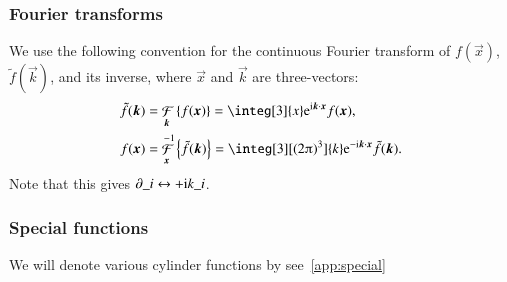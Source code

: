 \subsubsection{Fourier transforms} %
We use the following convention for the continuous Fourier transform of $f(\vec{x})$, $\tilde{f}(\vec{k})$, and its inverse, where $\vec{x}$ and $\vec{k}$ are three-vectors:
\begin{equation}\label{eq:notation:Fourier_transform_and_inverse}
    \begin{split}
        \tilde{f}(\vec{k}) &=\mathop{\mathcal{F}}_{\vec{k}} {\cclosed{f(\vec{x})}}  =\integ[3]{x}\eu[\im \vec{k}\cdot \vec{x}]f(\vec{x}), \\
        f(\vec{x}) &=  \mathop{\mathcal{F}}_{\vec{x}}^{-1}  {\cclosed{\tilde{f}(\vec{k})}}  =\integ[3][(2\ppi)^3]{k} \eu[-\im \vec{k}\cdot \vec{x}]\tilde{f}(\vec{k}).
    \end{split}
\end{equation}
Note that this gives $\partial\_i \leftrightarrow +\mathrm{i} k\_i$.





\subsubsection{Special functions} %
We will denote various cylinder functions by \blahblah see~\cref{app:special}

